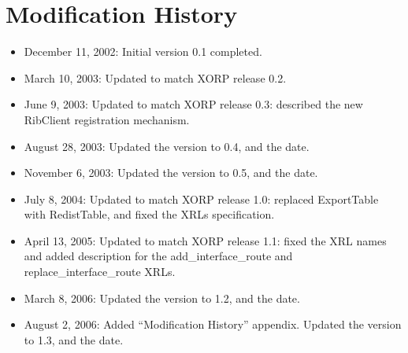 \documentclass[11pt]{article}
\begin{document}
\section{Modification History}

\begin{itemize}

  \item December 11, 2002: Initial version 0.1 completed.

  \item March 10, 2003: Updated to match XORP release 0.2.

  \item June 9, 2003: Updated to match XORP release 0.3: described the new
  RibClient registration mechanism.

  \item August 28, 2003: Updated the version to 0.4, and the date.

  \item November 6, 2003: Updated the version to 0.5, and the date.

  \item July 8, 2004: Updated to match XORP release 1.0: replaced ExportTable
  with RedistTable, and fixed the XRLs specification.

  \item April 13, 2005: Updated to match XORP release 1.1: fixed the XRL names
  and added description for the add\_interface\_route and
  replace\_interface\_route XRLs.

  \item March 8, 2006: Updated the version to 1.2, and the date.

  \item August 2, 2006: Added ``Modification History'' appendix.
  Updated the version to 1.3, and the date.

\end{itemize}




\end{document}
